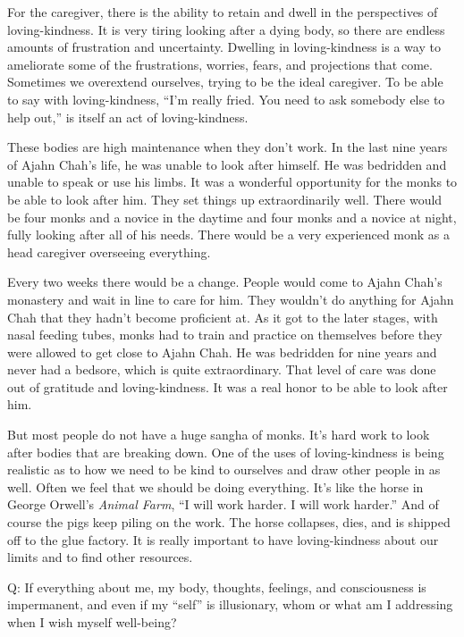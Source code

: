 For the caregiver, there is the ability to retain and dwell in the
perspectives of loving-kindness. It is very tiring looking after a dying
body, so there are endless amounts of frustration and uncertainty.
Dwelling in loving-kindness is a way to ameliorate some of the
frustrations, worries, fears, and projections that come. Sometimes we
overextend ourselves, trying to be the ideal caregiver. To be able to
say with loving-kindness, “I’m really fried. You need to ask somebody
else to help out,” is itself an act of loving-kindness.

These bodies are high maintenance when they don’t work. In the last nine
years of Ajahn Chah’s life, he was unable to look after himself. He was
bedridden and unable to speak or use his limbs. It was a wonderful
opportunity for the monks to be able to look after him. They set things
up extraordinarily well. There would be four monks and a novice in the
daytime and four monks and a novice at night, fully looking after all of
his needs. There would be a very experienced monk as a head caregiver
overseeing everything.

Every two weeks there would be a change. People would come to Ajahn
Chah’s monastery and wait in line to care for him. They wouldn’t do
anything for Ajahn Chah that they hadn’t become proficient at. As it got
to the later stages, with nasal feeding tubes, monks had to train and
practice on themselves before they were allowed to get close to Ajahn
Chah. He was bedridden for nine years and never had a bedsore, which is
quite extraordinary. That level of care was done out of gratitude and
loving-kindness. It was a real honor to be able to look after him.

But most people do not have a huge sangha of monks. It’s hard work to
look after bodies that are breaking down. One of the uses of
loving-kindness is being realistic as to how we need to be kind to
ourselves and draw other people in as well. Often we feel that we should
be doing everything. It’s like the horse in George Orwell’s \emph{Animal
Farm}, “I will work harder. I will work harder.” And of course the pigs
keep piling on the work. The horse collapses, dies, and is shipped off
to the glue factory. It is really important to have loving-kindness
about our limits and to find other resources.

\qaspace
Q: If everything about me, my body, thoughts, feelings, and
consciousness is impermanent, and even if my “self” is illusionary, whom
or what am I addressing when I wish myself well-being?

